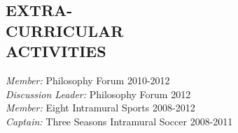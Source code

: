 \documentclass[line,margin]{res}
\begin{document}
\begin{resume}
\section{EXTRA-\\CURRICULAR \\ ACTIVITIES} {\sl Member:} Philosophy Forum \hfill 2010-2012\\
{\sl Discussion Leader:} Philosophy Forum \hfill 2012\\
{\sl Member:} Eight Intramural Sports \hfill 2008-2012\\
{\sl Captain:} Three Seasons Intramural Soccer \hfill 2008-2011\\
\end{resume}
\end{document}
